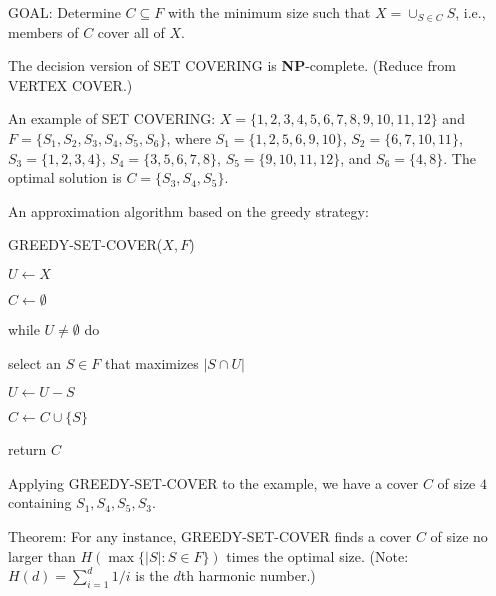 \documentclass{article}
\begin{document}
\begin{itemize}
GOAL: Determine $C\subseteq F$ with the minimum size such that
$X=\cup_{S\in C}S$, i.e., members of $C$ cover all of $X$.
                                                                              
The decision version of SET COVERING is {\bf NP}-complete.
(Reduce from VERTEX COVER.)
                                                                            
An example of SET COVERING:
$X=\{1,2,3,4,5,6,7,8,9,10,11,12\}$ and $F=\{S_1,S_2,S_3,S_4,S_5,S_6\}$,
where $S_1=\{1,2,5,6,9,10\}$, $S_2=\{6,7,10,11\}$,
$S_3=\{1,2,3,4\}$, $S_4=\{3,5,6,7,8\}$, $S_5=\{9,10,11,12\}$, and
$S_6=\{4,8\}$. The optimal solution is $C=\{S_3,S_4,S_5\}$.

An approximation algorithm based on the greedy strategy:
	
GREEDY-SET-COVER($X,F$)
                                                                                
\qquad $U\leftarrow X$
                                                                               
\qquad $C\leftarrow\emptyset$
                                                                           
\qquad while $U\not=\emptyset$ do
                                                                             
\qquad\quad select an $S\in F$ that maximizes $|S\cap U|$
                                                                         
\qquad\quad $U\leftarrow U-S$
                                                                          
\qquad\quad $C\leftarrow C\cup \{S\}$
                                                                           
\qquad return $C$
                                                                          
Applying GREEDY-SET-COVER to the example, we have a cover $C$ of
size $4$ containing $S_1,S_4,S_5,S_3$.
	
Theorem: For any instance, GREEDY-SET-COVER finds a cover $C$ of size
no larger than $H(\max\{|S|:S\in F\})$ times the optimal size. (Note:
$H(d)=\sum_{i=1}^d1/i$ is the $d$th harmonic number.)


\end{itemize}
\end{document}

